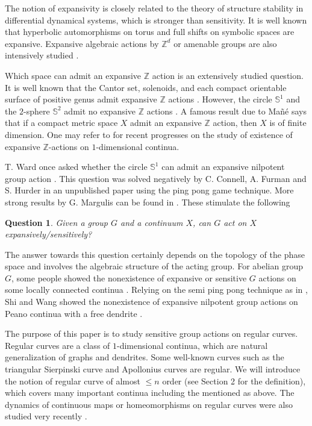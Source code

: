 \documentclass[12pt,a4paper]{amsart}
\newtheorem{ques}[thm]{Question}
\theoremstyle{definition}
\numberwithin{equation}{section}
\begin{document}
The notion of expansivity is closely related to the theory of structure stability in differential dynamical systems,
which is stronger than sensitivity. It is well known that hyperbolic automorphisms on torus and full shifts on
symbolic spaces are expansive. Expansive algebraic actions by $\mathbb Z^d$ or amenable groups are also intensively studied \cite{CL, LS}.

Which space can admit an expansive $\mathbb Z$ action is an extensively studied question.
It is well known that the Cantor set, solenoids, and each compact orientable surface of positive genus admit expansive $\mathbb Z$ actions \cite{OR,Wi}.  However, the
circle $\mathbb S^1$ and the $2$-sphere $\mathbb S^2$ admit no expansive $\mathbb Z$ actions \cite{Hir}. A famous result due to Ma\~{n}\'{e} \cite{Ma} says
that if a compact metric space $X$ admit an expansive $\mathbb Z$ action, then $X$ is of finite dimension. One may refer
to \cite{Ka96,KM,Mo02,Mo09} for recent progresses on the study of existence of expansive $\mathbb Z$-actions on $1$-dimensional continua.

T. Ward once asked whether the circle $\mathbb S^1$ can admit an expansive nilpotent group action \cite{KLP}. This question was
solved negatively by C. Connell, A. Furman and S. Hurder in an unpublished paper \cite{CFH} using the ping pong game technique. More strong results by
G. Margulis can be found in \cite{Mar}. These stimulate the following
\begin{ques}\label{ques}
 Given a group $G$ and a continuum $X$, can $G$ act on $X$ expansively/sensitively?
\end{ques}
The answer towards this question certainly depends on the topology of the phase space and involves the algebraic structure of the acting group.
For abelian group $G$, some people showed the nonexistence of expansive
or sensitive $G$ actions on some locally connected continua \cite{MS07, MS12}. Relying on the semi ping pong technique as in \cite{CFH},
Shi and Wang showed the nonexistence of expansive nilpotent group actions on Peano continua with a free dendrite \cite{SW}.

The purpose of this paper is to study sensitive group actions on regular curves. Regular curves are a class of $1$-dimensional
continua, which are natural generalization of graphs and dendrites. Some well-known curves such as the triangular Sierpinski
curve and Apollonius curves are regular. We will introduce the notion of regular curve of almost $\leq n$ order (see Section 2 for
the definition), which covers many important continua including the mentioned as above. The dynamics of continuous maps or homeomorphisms on regular curves
were also studied very recently \cite{Ka06, Ka07, Nag17, Nag20}.
\end{document}
